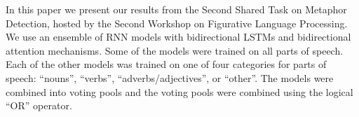 In this paper we present our results from the Second Shared Task on Metaphor Detection, hosted by the Second Workshop on Figurative Language Processing. We use an ensemble of RNN models with bidirectional LSTMs and bidirectional attention mechanisms.   Some of the models were trained on all parts of speech. Each of the other models was trained on one of four categories for parts of speech: ``nouns'', ``verbs'', ``adverbs/adjectives'', or ``other''. The  models were combined into voting pools and the voting pools were combined using the logical ``OR'' operator.
